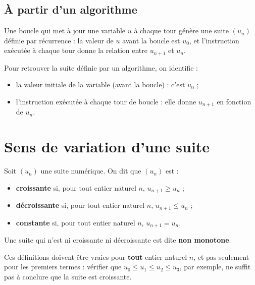 \documentclass[10pt,a4paper]{article}
\begin{document}
\subsection{À partir d'un algorithme}

\begin{rem}
    Une boucle qui met à jour une variable \(u\) à chaque tour génère une suite \((u_n)\) définie par récurrence : la valeur de \(u\) avant la boucle est \(u_0\), et l'instruction exécutée à chaque tour donne la relation entre \(u_{n+1}\) et \(u_n\).
\end{rem}

\begin{met}
    Pour retrouver la suite définie par un algorithme, on identifie :
    \begin{itemize}
        \item la valeur initiale de la variable (avant la boucle) : c'est \(u_0\) ;
        \item l'instruction exécutée à chaque tour de boucle : elle donne \(u_{n+1}\) en fonction de \(u_n\).
    \end{itemize}
\end{met}

\section{Sens de variation d'une suite}

\begin{defi}
    Soit \((u_n)\) une suite numérique. On dit que \((u_n)\) est :
    \begin{itemize}
        \item \textbf{croissante} si, pour tout entier naturel \(n\), \(u_{n+1}\geq u_n\) ;
        \item \textbf{décroissante} si, pour tout entier naturel \(n\), \(u_{n+1}\leq u_n\) ;
        \item \textbf{constante} si, pour tout entier naturel \(n\), \(u_{n+1} = u_n\).
    \end{itemize}
    Une suite qui n'est ni croissante ni décroissante est dite \textbf{non monotone}.
\end{defi}

\begin{rem}
    Ces définitions doivent être vraies pour \textbf{tout} entier naturel \(n\), et pas seulement pour les premiers termes : vérifier que \(u_0\leq u_1\leq u_2\leq u_3\), par exemple, ne suffit pas à conclure que la suite est croissante.
\end{rem}
\end{document}
